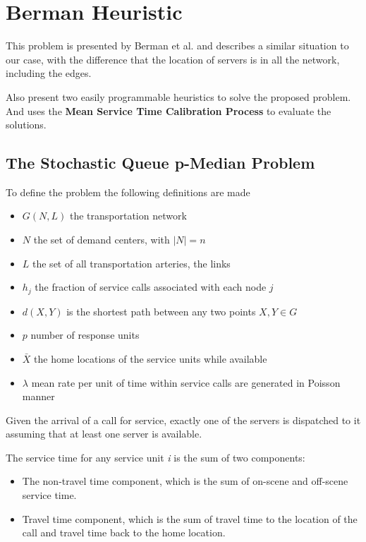 \chapter{Berman Heuristic}
This problem is presented by Berman et al. \cite{berman1987stochastic}
and describes a similar situation to our case,
with the difference
that the location of servers
is in all the network,
including the edges.

Also present two easily programmable heuristics
to solve the proposed problem.
And uses the \textbf{Mean Service Time Calibration Process}
to evaluate the solutions.

\section{The Stochastic Queue p-Median Problem}
To define the problem
the following definitions are made
\begin{itemize}
\item $G(N,L)$ the transportation network
\item $N$ the set of demand centers,
  with $|N| = n$
\item $L$ the set of all transportation arteries,
  the links
\item $h_j$ the fraction of service calls
  associated with each node $j$
\item $d(X,Y)$ is the shortest path between any two points $X,Y \in G$
\item $p$ number of response units
\item $\bar{X}$ the home locations of the service units while available
\item $\lambda$ mean rate per unit of time
  within service calls are generated in Poisson manner
\end{itemize}

Given the arrival of a call for service,
exactly one of the servers is dispatched to it
assuming that at least one server is available.

The service time for any service unit \textit{i}
is the sum of two components:
\begin{itemize}
\item The non-travel time component,
  which is the sum of
  on-scene and off-scene service time.
\item Travel time component,
  which is the sum of travel time
  to the location of the call
  and travel time back to the home location.
\end{itemize}

